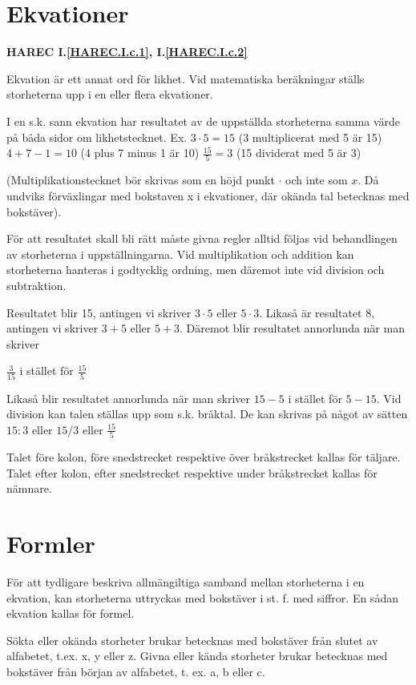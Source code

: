 \section{Ekvationer}
\textbf{HAREC I.\ref{HAREC.I.c.1}\label{myHAREC.I.c.1}, I.\ref{HAREC.I.c.2}\label{myHAREC.I.c.2}}

Ekvation är ett annat ord för likhet. Vid matematiska beräkningar ställs
storheterna upp i en eller flera ekvationer.

I en s.k. sann ekvation har resultatet av de uppställda storheterna samma värde
på båda sidor om likhetstecknet.
Ex. \(3 \cdot 5 = 15\) (3 multiplicerat med 5 är 15)
\(4 + 7 - 1 = 10\) (4 plus 7 minus 1 är 10)
\(\frac{15}{5} = 3\) (15 dividerat med 5 är 3)

(Multiplikationstecknet bör skrivas som en höjd punkt \(\cdot\) och inte som \(x\).
Då undviks förväxlingar med bokstaven x i ekvationer, där okända tal betecknas
med bokstäver).

För att resultatet skall bli rätt måste givna regler alltid följas vid
behandlingen av storheterna i uppställningarna. Vid multiplikation och addition
kan storheterna hanteras i godtycklig ordning, men däremot inte vid division och
subtraktion.

Resultatet blir 15, antingen vi skriver \(3 \cdot 5\) eller \(5 \cdot 3\).
Likaså är resultatet 8, antingen vi skriver \(3 + 5\) eller \(5 + 3\).
Däremot blir resultatet annorlunda när man skriver

\(\frac{3}{15}\) i stället för \(\frac{15}{5}\)

Likaså blir resultatet annorlunda när man skriver \(15 - 5\) i stället för
\(5 - 15\). Vid division kan talen ställas upp som s.k. bråktal. De kan skrivas på
något av sätten \(15:3\) eller \(15/3\) eller \(\frac{15}{5}\)

Talet före kolon, före snedstrecket respektive över bråkstrecket kallas för
täljare.
Talet efter kolon, efter snedstrecket respektive under bråkstrecket kallas för
nämnare.


\section{Formler}
För att tydligare beskriva allmängiltiga samband mellan storheterna i en
ekvation, kan storheterna uttryckas med bokstäver i st. f. med siffror. En sådan
ekvation kallas för formel.

Sökta eller okända storheter brukar betecknas med bokstäver från slutet av
alfabetet, t.ex. x, y eller z. Givna eller kända storheter brukar betecknas med
bokstäver från början av alfabetet, t. ex. a, b eller c.

